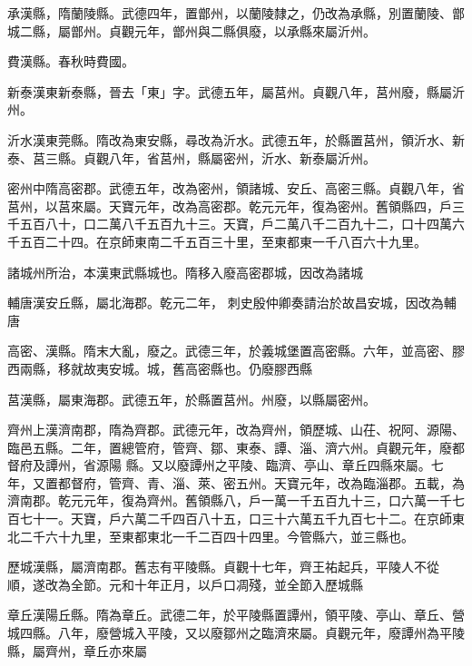 \begin{pinyinscope}
 承漢縣，隋蘭陵縣。武德四年，置鄫州，以蘭陵隸之，仍改為承縣，別置蘭陵、鄫城二縣，屬鄫州。貞觀元年，鄫州與二縣俱廢，以承縣來屬沂州。



 費漢縣。春秋時費國。



 新泰漢東新泰縣，晉去「東」字。武德五年，屬莒州。貞觀八年，莒州廢，縣屬沂州。



 沂水漢東莞縣。隋改為東安縣，尋改為沂水。武德五年，於縣置莒州，領沂水、新泰、莒三縣。貞觀八年，省莒州，縣屬密州，沂水、新泰屬沂州。



 密州中隋高密郡。武德五年，改為密州，領諸城、安丘、高密三縣。貞觀八年，省莒州，以莒來屬。天寶元年，改為高密郡。乾元元年，復為密州。舊領縣四，戶三千五百八十，口二萬八千五百九十三。天寶，戶二萬八千二百九十二，口十四萬六千五百二十四。在京師東南二千五百三十里，至東都東一千八百六十九里。



 諸城州所治，本漢東武縣城也。隋移入廢高密郡城，因改為諸城



 輔唐漢安丘縣，屬北海郡。乾元二年，
 刺史殷仲卿奏請治於故昌安城，因改為輔唐



 高密、漢縣。隋末大亂，廢之。武德三年，於義城堡置高密縣。六年，並高密、膠西兩縣，移就故夷安城。城，舊高密縣也。仍廢膠西縣



 莒漢縣，屬東海郡。武德五年，於縣置莒州。州廢，以縣屬密州。



 齊州上漢濟南郡，隋為齊郡。武德元年，改為齊州，領歷城、山茌、祝阿、源陽、臨邑五縣。二年，置總管府，管齊、鄒、東泰、譚、淄、濟六州。貞觀元年，廢都督府及譚州，省源陽
 縣。又以廢譚州之平陵、臨濟、亭山、章丘四縣來屬。七年，又置都督府，管齊、青、淄、萊、密五州。天寶元年，改為臨淄郡。五載，為濟南郡。乾元元年，復為齊州。舊領縣八，戶一萬一千五百九十三，口六萬一千七百七十一。天寶，戶六萬二千四百八十五，口三十六萬五千九百七十二。在京師東北二千六十九里，至東都東北一千二百四十四里。今管縣六，並三縣也。



 歷城漢縣，屬濟南郡。舊志有平陵縣。貞觀十七年，齊王祐起兵，平陵人不從
 順，遂改為全節。元和十年正月，以戶口凋殘，並全節入歷城縣



 章丘漢陽丘縣。隋為章丘。武德二年，於平陵縣置譚州，領平陵、亭山、章丘、營城四縣。八年，廢營城入平陵，又以廢鄒州之臨濟來屬。貞觀元年，廢譚州為平陵縣，屬齊州，章丘亦來屬




\end{pinyinscope}
